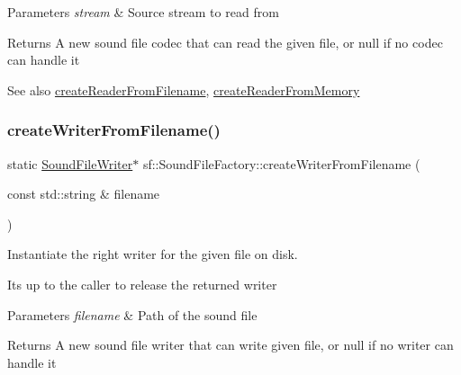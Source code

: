 \begin{DoxyParams}{Parameters}
{\em stream} & Source stream to read from\\
\hline
\end{DoxyParams}
\begin{DoxyReturn}{Returns}
A new sound file codec that can read the given file, or null if no codec can handle it
\end{DoxyReturn}
\begin{DoxySeeAlso}{See also}
\hyperlink{classsf_1_1_sound_file_factory_af0a87110e0b8a77aada17b22a016c066}{create\+Reader\+From\+Filename}, \hyperlink{classsf_1_1_sound_file_factory_aee7a0ff1eace98d5325eaadc7d26d50c}{create\+Reader\+From\+Memory} 
\end{DoxySeeAlso}
\mbox{\label{classsf_1_1_sound_file_factory_a0702eb2e8a4a171ba80c7fbd04c4defc}} 
\subsubsection{\texorpdfstring{create\+Writer\+From\+Filename()}{createWriterFromFilename()}}
{\footnotesize\ttfamily static \hyperlink{classsf_1_1_sound_file_writer}{Sound\+File\+Writer}$\ast$ sf\+::\+Sound\+File\+Factory\+::create\+Writer\+From\+Filename (\begin{DoxyParamCaption}\item[{const std\+::string \&}]{filename }\end{DoxyParamCaption})\hspace{0.3cm}{\ttfamily [static]}}



Instantiate the right writer for the given file on disk. 

It\textquotesingle{}s up to the caller to release the returned writer


\begin{DoxyParams}{Parameters}
{\em filename} & Path of the sound file\\
\hline
\end{DoxyParams}
\begin{DoxyReturn}{Returns}
A new sound file writer that can write given file, or null if no writer can handle it 
\end{DoxyReturn}
\mbox{\label{classsf_1_1_sound_file_factory_acaf1f0bf1b7c7b9988ec76b33e33fe95}} 
